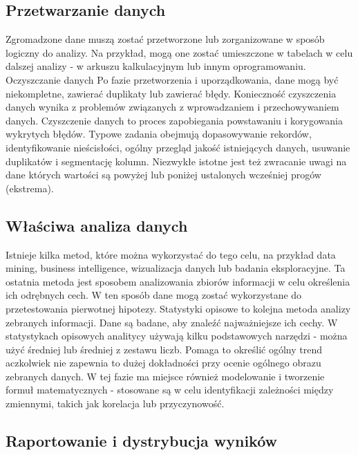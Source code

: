 \documentclass[
  polish,
  letterpaper,
  DIV=11,
  numbers=noendperiod]{scrreprt}
\begin{document}
\subsection{Przetwarzanie danych}\label{przetwarzanie-danych}

Zgromadzone dane muszą zostać przetworzone lub zorganizowane w sposób
logiczny do analizy. Na przykład, mogą one zostać umieszczone w tabelach
w celu dalszej analizy - w arkuszu kalkulacyjnym lub innym
oprogramowaniu. Oczyszczanie danych Po fazie przetworzenia i
uporządkowania, dane mogą być niekompletne, zawierać duplikaty lub
zawierać błędy. Konieczność czyszczenia danych wynika z problemów
związanych z wprowadzaniem i przechowywaniem danych. Czyszczenie danych
to proces zapobiegania powstawaniu i korygowania wykrytych błędów.
Typowe zadania obejmują dopasowywanie rekordów, identyfikowanie
nieścisłości, ogólny przegląd jakość istniejących danych, usuwanie
duplikatów i segmentację kolumn. Niezwykłe istotne jest też zwracanie
uwagi na dane których wartości są powyżej lub poniżej ustalonych
wcześniej progów (ekstrema).

\subsection{Właściwa analiza
danych}\label{wux142aux15bciwa-analiza-danych}

Istnieje kilka metod, które można wykorzystać do tego celu, na przykład
data mining, business intelligence, wizualizacja danych lub badania
eksploracyjne. Ta ostatnia metoda jest sposobem analizowania zbiorów
informacji w celu określenia ich odrębnych cech. W ten sposób dane mogą
zostać wykorzystane do przetestowania pierwotnej hipotezy. Statystyki
opisowe to kolejna metoda analizy zebranych informacji. Dane są badane,
aby znaleźć najważniejsze ich cechy. W statystykach opisowych analitycy
używają kilku podstawowych narzędzi - można użyć średniej lub średniej z
zestawu liczb. Pomaga to określić ogólny trend aczkolwiek nie zapewnia
to dużej dokładności przy ocenie ogólnego obrazu zebranych danych. W tej
fazie ma miejsce również modelowanie i tworzenie formuł matematycznych -
stosowane są w celu identyfikacji zależności między zmiennymi, takich
jak korelacja lub przyczynowość.

\subsection{Raportowanie i dystrybucja
wyników}\label{raportowanie-i-dystrybucja-wynikuxf3w}
\end{document}

